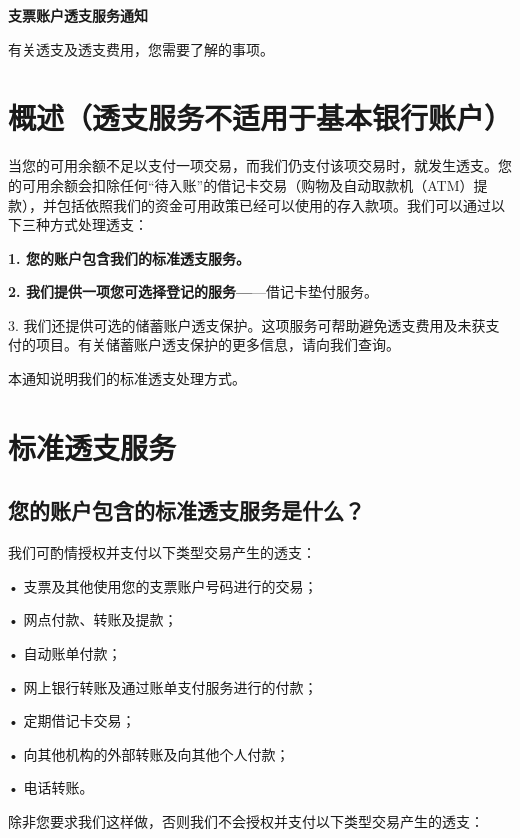 \documentclass[UTF8,fontset=none,11pt,a4paper]{ctexart}
\begin{document}
{\noindent\fontsize{20}{25}\selectfont\bfseries 支票账户透支服务通知\par}
\vspace{10pt}
有关透支及透支费用，您需要了\allowbreak\mbox{解的事项。}


\section*{概述（透支服务不适用于基本银行账户）}
当您的可用余额不足以支付一项交易，而我们仍支付该项交易时，就发生透支。您的可用余额会扣除任何“待入账”的借记卡交易（购物及自动取款机（ATM）提款），并包括依照我们的资金可用政策已经可以使用的存入款项。我们可以通过以下三种方式处\allowbreak\mbox{理透支：}


\textbf{1. 您的账户包含我们的标准透支服务。}


\textbf{2. 我们提供一项您可选择登记的服务—}—借记卡\allowbreak\mbox{垫付服务。}


3. 我们还提供可选的储蓄账户透支保护。这项服务可帮助避免透支费用及未获支付的项目。有关储蓄账户透支保护的更多信息，请向\allowbreak\mbox{我们查询。}


本通知说明我们的标准透支\allowbreak\mbox{处理方式。}


\section*{标准透支服务}
\subsection*{您的账户包含的标准透支服务是什么？}
我们可酌情授权并支付以下类型交易产\allowbreak\mbox{生的透支：}


• 支票及其他使用您的支票账户号码进\allowbreak\mbox{行的交易；}


• 网点付款、转\allowbreak\mbox{账及提款；}


• 自动\allowbreak\mbox{账单付款；}


• 网上银行转账及通过账单支付服务进\allowbreak\mbox{行的付款；}


• 定期借\allowbreak\mbox{记卡交易；}


• 向其他机构的外部转账及向其他\allowbreak\mbox{个人付款；}


• \allowbreak\mbox{电话转账。}


除非您要求我们这样做，否则我们不会授权并支付以下类型交易产\allowbreak\mbox{生的透支：}
\end{document}
